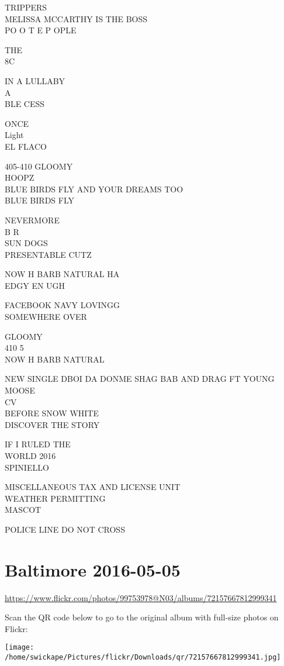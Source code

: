 \documentclass[10pt,letterpaper]{article}
\begin{document}
TRIPPERS\\
MELISSA MCCARTHY IS THE BOSS\\
PO O T E P OPLE

THE\\
8C

IN A LULLABY\\
A\\
BLE CESS

ONCE\\
Light\\
EL FLACO

405{-}410 GLOOMY\\
HOOPZ\\
BLUE BIRDS FLY AND YOUR DREAMS TOO\\
BLUE BIRDS FLY

NEVERMORE\\
B R\\
SUN DOGS\\
PRESENTABLE CUTZ

NOW H BARB NATURAL HA\\
EDGY EN UGH

FACEBOOK NAVY LOVINGG\\
SOMEWHERE OVER

GLOOMY\\
410 5\\
NOW H BARB NATURAL

NEW SINGLE DBOI DA DONME SHAG BAB AND DRAG FT YOUNG MOOSE\\
CV\\
BEFORE SNOW WHITE\\
DISCOVER THE STORY

IF I RULED THE\\
WORLD 2016\\
SPINIELLO

MISCELLANEOUS TAX AND LICENSE UNIT\\
WEATHER PERMITTING\\
MASCOT

POLICE LINE DO NOT CROSS
\pagebreak

\section*{Baltimore 2016-05-05}

\url{https://www.flickr.com/photos/99753978@N03/albums/72157667812999341}

Scan the QR code below to go to the original album with full-size photos on Flickr:

\texttt{[image: /home/swickape/Pictures/flickr/Downloads/qr/72157667812999341.jpg]}
\pagebreak
\end{document}
